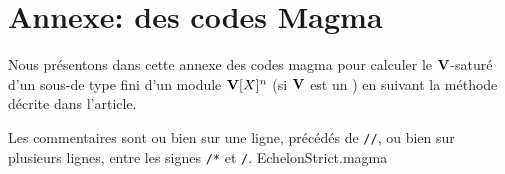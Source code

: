 \section{Annexe: des codes Magma} \label{fcode}

%
%
%
%

Nous présentons dans cette annexe des codes magma pour calculer
le $\mathbf{V}$-saturé d'un sous-\VXmo de type fini d'un module $\mathbf{V}[X]^{n}$
 (si $\mathbf{V}$ est un \ddv \dcd) en suivant la méthode décrite dans
 l'article.
 
Les commentaires sont ou bien sur une ligne, précédés de {\tt //},
ou bien sur plusieurs lignes, entre les signes {\tt /*} et {\tt */}.
{\small  {EchelonStrict.magma}
}




